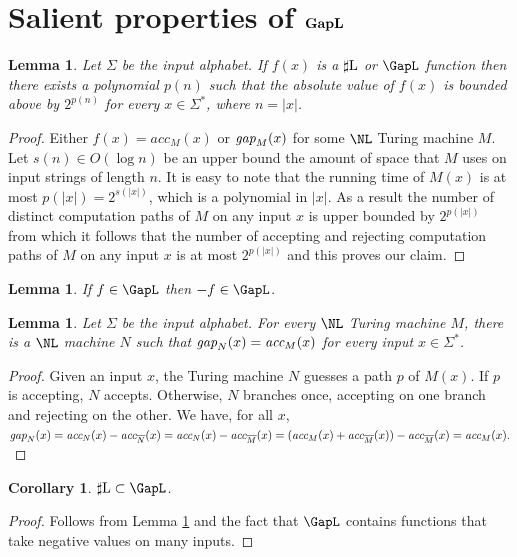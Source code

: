 \documentclass{amsbook}
\newtheorem{lemma}[theorem]{Lemma}
\newtheorem{corollary}[theorem]{Corollary}
\theoremstyle{definition}
\theoremstyle{remark}
\numberwithin{section}{chapter}
\numberwithin{equation}{chapter}
\newcommand{\sharpL}{\mbox{$\sharp$\rm L}}
\newcommand{\boldGapL}{\mbox{\rm \bf GapL}}
\newcommand{\acc}{\mbox{\it acc}}
\newcommand{\gap}{\mbox{\it gap}}
\begin{document}
\section{Salient properties of $\boldGapL$}
\begin{lemma}\label{computationpathsupperbound}
Let $\Sigma$ be the input alphabet. If $f(x)$ is a $\sharpL$ or $\GapL$ function then there exists a polynomial $p(n)$ such that the absolute value of $f(x)$ is bounded above by $2^{p(n)}$ for every $x\in\Sigma^*$, where $n=|x|$.
\end{lemma}
\begin{proof}
Either $f(x)=acc _M(x)$ or $\gap _M(x)$ for some $\NL$ Turing machine $M$. Let $s(n)\in O(\log n)$ be an upper bound the amount of space that $M$ uses on input strings of length $n$. It is easy to note that the running time of $M(x)$ is at most $p(|x|)=2^{s(|x|)}$, which is a polynomial in $|x|$. As a result the number of distinct computation paths of $M$ on any input $x$ is upper bounded by $2^{p(|x|)}$ from which it follows that the number of  accepting and rejecting computation paths of $M$ on any input $x$ is at most $2^{p(|x|)}$ and this proves our claim.
\end{proof}

\begin{lemma}\label{gaplcomplement}
If $f\in\GapL$ then $-f\in\GapL$.
\end{lemma}

\begin{lemma}\label{chap06-gaplsharpl}
Let $\Sigma$ be the input alphabet. For every $\NL$ Turing machine $M$, there is a $\NL$ machine $N$ such that $\gap_N(x)=\acc_M(x)$ for every input $x\in\Sigma^*$.
\end{lemma}
\begin{proof}
Given an input $x$, the Turing machine $N$ guesses a path $p$ of $M(x)$. If $p$ is accepting, $N$ accepts. Otherwise, $N$ branches once, accepting on one branch and rejecting on the other. We have, for all $x$, $\gap_N(x)=\acc_N(x)-\acc_{\overline{N}}(x)=\acc_N(x)-\acc_{\overline{M}}(x)=(\acc_M(x)+\acc_{\overline{M}}(x))-\acc_{\overline{M}}(x)=\acc_M(x).$
\end{proof}
\begin{corollary}\label{corollary-gaplsharpl}
$\sharpL\subset\GapL$.
\end{corollary}
\begin{proof}
Follows from Lemma \ref{chap06-gaplsharpl} and the fact that $\GapL$ contains functions that take negative values on many inputs.
\end{proof}
\end{document}
